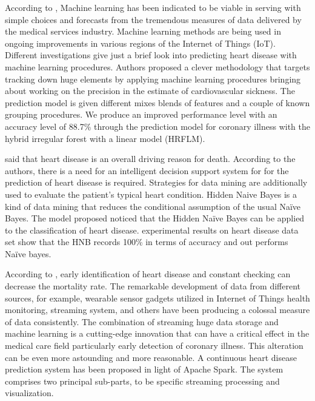 {{}
According to \citealp{mohan2019effective}, Machine learning has been indicated to be viable in serving with simple choices and forecasts from the tremendous measures of data delivered by the medical services industry. Machine learning methods are being used in ongoing improvements in various regions of the Internet of Things (IoT). Different investigations give just a brief look into predicting heart disease with machine learning procedures. Authors proposed a clever methodology that targets tracking down huge elements by applying machine learning procedures bringing about working on the precision in the estimate of cardiovascular sickness. The prediction model is given different mixes blends of features and a couple of known grouping procedures. We produce an improved performance level with an accuracy level of 88.7\% through the prediction model for coronary illness with the hybrid irregular forest with a linear model (HRFLM).

\citealp{jabbar2016heart} said that heart disease is an overall driving reason for death. According to the authors, there is a need for an intelligent decision support system for for the prediction of heart disease is required. Strategies for data mining are additionally used to evaluate the patient's typical heart condition. Hidden Naive Bayes is a kind of data mining that reduces the conditional assumption of the usual Naïve Bayes. The model proposed noticed that the Hidden Naïve Bayes can be applied to the classification of heart disease. experimental results on heart disease data set show that the HNB records 100\% in terms of accuracy and out performs Naïve bayes.

According to \citealp{ed2019real}, early identification of heart disease and constant checking can decrease the mortality rate. The remarkable development of data from different sources, for example, wearable sensor gadgets utilized in Internet of Things health monitoring, streaming system, and others have been producing a colossal measure of data consistently. The combination of streaming huge data storage and machine learning is a cutting-edge innovation that can have a critical effect in the medical care field particularly early detection of coronary illness. This alteration can be even more astounding and more reasonable. A continuous heart disease prediction system has been proposed in light of Apache Spark. The system comprises two principal sub-parts, to be specific streaming processing and visualization.

}
